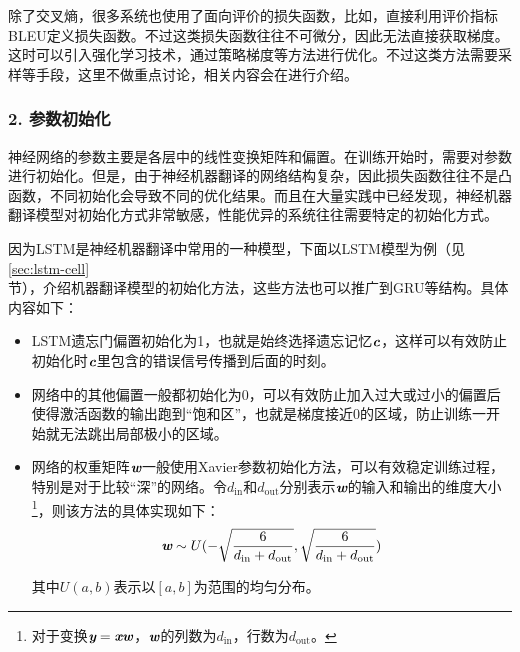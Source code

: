 \parinterval 除了交叉熵，很多系统也使用了面向评价的损失函数，比如，直接利用评价指标BLEU定义损失函数。不过这类损失函数往往不可微分，因此无法直接获取梯度。这时可以引入强化学习技术，通过策略梯度等方法进行优化。不过这类方法需要采样等手段，这里不做重点讨论，相关内容会在{\chapterthirteen}进行介绍。


\subsubsection{2. 参数初始化}

\parinterval 神经网络的参数主要是各层中的线性变换矩阵和偏置。在训练开始时，需要对参数进行初始化。但是，由于神经机器翻译的网络结构复杂，因此损失函数往往不是凸函数，不同初始化会导致不同的优化结果。而且在大量实践中已经发现，神经机器翻译模型对初始化方式非常敏感，性能优异的系统往往需要特定的初始化方式。

\parinterval 因为LSTM是神经机器翻译中常用的一种模型，下面以LSTM模型为例（见\ref{sec:lstm-cell}\\ 节），介绍机器翻译模型的初始化方法，这些方法也可以推广到GRU等结构。具体内容如下：

\begin{itemize}
\vspace{0.5em}
\item LSTM遗忘门偏置初始化为1，也就是始终选择遗忘记忆$\textbf{\em c}$，这样可以有效防止初始化时$\textbf{\em c}$里包含的错误信号传播到后面的时刻。
\vspace{0.5em}
\item 网络中的其他偏置一般都初始化为0，可以有效防止加入过大或过小的偏置后使得激活函数的输出跑到“饱和区”，也就是梯度接近0的区域，防止训练一开始就无法跳出局部极小的区域。
\vspace{0.5em}
\item 网络的权重矩阵$\textbf{\em w}$一般使用Xavier参数初始化方法，可以有效稳定训练过程，特别是对于比较“深”的网络。令$d_{\textrm{in}}$和$d_{\textrm{out}}$分别表示$\textbf{\em w}$的输入和输出的维度大小\footnote{对于变换$\textbf{\em y} = \textbf{\em x} \textbf{\em w}$，$\textbf{\em w}$的列数为$d_{\textrm{in}}$，行数为$d_{\textrm{out}}$。}，则该方法的具体实现如下：
\begin{eqnarray}
\mathbi{w} \sim U(-\sqrt{ \frac{6} { d_{\textrm{in}} + d_{\textrm{out}} } } , \sqrt{ \frac{6} { d_{\textrm{in}} + d_{\textrm{out}} } })
\label{eq:10-27}
\vspace{0.5em}
\end{eqnarray}

其中$U(a,b)$表示以$[a,b]$为范围的均匀分布。\\
\end{itemize}

